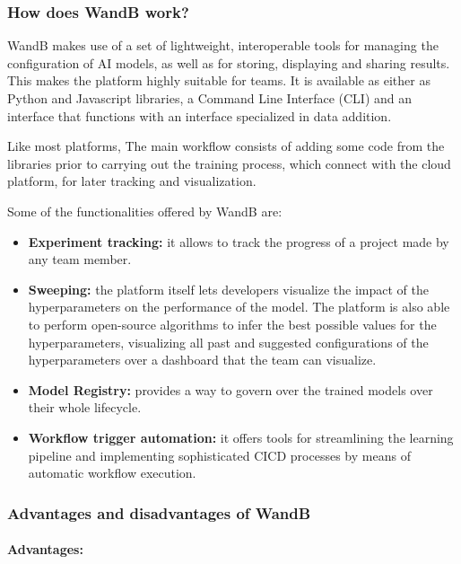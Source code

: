 \subsubsection{How does WandB work?}

WandB makes use of a set of lightweight, interoperable tools for managing the configuration of AI models, as well as for storing, displaying and sharing results. This 
makes the platform highly suitable for teams. It is available as either as Python and Javascript libraries, a Command Line Interface (CLI) and an interface that 
functions with an interface specialized in data addition.

Like most platforms, The main workflow consists of adding some code from the libraries prior to carrying out the training process, which connect with the cloud platform,
for later tracking and visualization.

Some of the functionalities offered by WandB are:

\begin{itemize}
    \item \textbf{Experiment tracking: }it allows to track the progress of a project made by any team member.
    \item \textbf{Sweeping: }the platform itself lets developers visualize the impact of the hyperparameters on the performance of the model. The platform is also able to 
    perform open-source algorithms to infer the best possible values for the hyperparameters, visualizing all past and suggested configurations of the hyperparameters
    over a dashboard that the team can visualize.
    \item \textbf{Model Registry: }provides a way to govern over the trained models over their whole lifecycle.
    \item \textbf{Workflow trigger automation: }it offers tools for streamlining the learning pipeline and implementing sophisticated \acrfull{CICD} processes by means of 
    automatic workflow execution.
\end{itemize}

\subsubsection{Advantages and disadvantages of WandB}

\paragraph{Advantages: }

